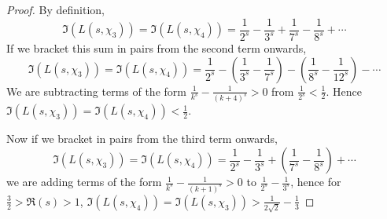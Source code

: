 \documentclass{unswmaths}
\begin{document}
    \begin{proof}
        By definition,
        \begin{equation*}
            \Im(L(s,\chi_3)) = \Im(L(s,\chi_4)) = \frac{1}{2^s}-\frac{1}{3^s}+\frac{1}{7^s}-\frac{1}{8^s}+\cdots
        \end{equation*}
        If we bracket this sum in pairs from the second term onwards,
        \begin{equation*}
            \Im(L(s,\chi_3)) = \Im(L(s,\chi_4)) = \frac{1}{2^s}-\left(\frac{1}{3^s}-\frac{1}{7^s}\right)-\left(\frac{1}{8^s}-\frac{1}{12^s}\right)-\cdots
        \end{equation*}
        We are subtracting terms of the form $\frac{1}{k^s}-\frac{1}{(k+4)^s} > 0$ from $\frac{1}{2^s} < \frac{1}{2}$. Hence $\Im(L(s,\chi_3)) = \Im(L(s,\chi_4)) < \frac{1}{2}$.
        
        Now if we bracket in pairs from the third term onwards,
        \begin{equation*}
            \Im(L(s,\chi_3)) = \Im(L(s,\chi_4)) = \frac{1}{2^s}-\frac{1}{3^s}+\left(\frac{1}{7^s}-\frac{1}{8^s}\right)+\cdots
        \end{equation*}
        we are adding terms of the form $\frac{1}{k^s}-\frac{1}{(k+1)^s} > 0$ to $\frac{1}{2^s}-\frac{1}{3^s}$, hence for $\frac{3}{2} > \Re(s) > 1$, $\Im(L(s,\chi_4)) = \Im(L(s,\chi_3)) > \frac{1}{2\sqrt{2}}-\frac{1}{3}$
    \end{proof} 
    
\end{document}
